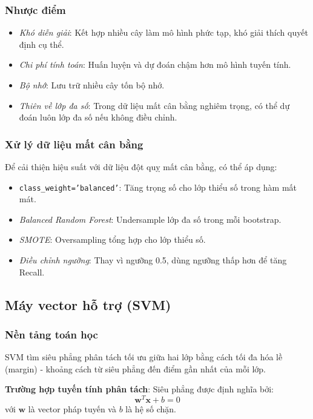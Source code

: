 ﻿\documentclass{article}
\begin{document}
\subsubsection*{Nhược điểm}
\begin{itemize}
    \item \textit{Khó diễn giải}: Kết hợp nhiều cây làm mô hình phức tạp, khó giải thích quyết định cụ thể.
    \item \textit{Chi phí tính toán}: Huấn luyện và dự đoán chậm hơn mô hình tuyến tính.
    \item \textit{Bộ nhớ}: Lưu trữ nhiều cây tốn bộ nhớ.
    \item \textit{Thiên về lớp đa số}: Trong dữ liệu mất cân bằng nghiêm trọng, có thể dự đoán luôn lớp đa số nếu không điều chỉnh.
\end{itemize}

\subsubsection*{Xử lý dữ liệu mất cân bằng}
Để cải thiện hiệu suất với dữ liệu đột quỵ mất cân bằng, có thể áp dụng:
\begin{itemize}
    \item \texttt{class\_weight='balanced'}: Tăng trọng số cho lớp thiểu số trong hàm mất mát.
    \item \textit{Balanced Random Forest}: Undersample lớp đa số trong mỗi bootstrap.
    \item \textit{SMOTE}: Oversampling tổng hợp cho lớp thiểu số.
    \item \textit{Điều chỉnh ngưỡng}: Thay vì ngưỡng 0.5, dùng ngưỡng thấp hơn để tăng Recall.
\end{itemize}

\subsection{Máy vector hỗ trợ (SVM)}

\subsubsection*{Nền tảng toán học}
SVM tìm siêu phẳng phân tách tối ưu giữa hai lớp bằng cách tối đa hóa lề (margin) - khoảng cách từ siêu phẳng đến điểm gần nhất của mỗi lớp.

\textbf{Trường hợp tuyến tính phân tách}: Siêu phẳng được định nghĩa bởi:
\begin{equation}
\mathbf{w}^T\mathbf{x} + b = 0
\end{equation}
với $\mathbf{w}$ là vector pháp tuyến và $b$ là hệ số chặn.
\end{document}
